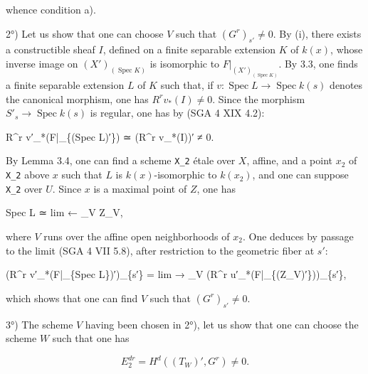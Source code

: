 \documentclass[
  11pt,
  a4paper,
]{book}
\newenvironment{Shaded}{}{}
\newcommand{\NormalTok}[1]{#1}
\begin{document}
whence condition a).

2°) Let us show that one can choose \(V\) such that
\((G^{r})_{s'} \neq 0\). By (i), there exists a constructible sheaf
\(I\), defined on a finite separable extension \(K\) of \(k(x)\), whose
inverse image on \((X')_{(\operatorname{Spec} K)}\) is isomorphic to
\(F|_{(X')_{(\operatorname{Spec} K)}}\). By 3.3, one finds a finite
separable extension \(L\) of \(K\) such that, if
\(v : \operatorname{Spec} L \to \operatorname{Spec} k(s)\) denotes the
canonical morphism, one has \(R^{r}
v_{*}(I) \neq 0\). Since the morphism
\(S'_{s} \to \operatorname{Spec} k(s)\) is regular, one has by (SGA 4
XIX 4.2):

\begin{Shaded}
\begin{Highlighting}[]
\NormalTok{R\^{}r v′\_*(F|\_\{(Spec L)′\}) ≃ (R\^{}r v\_*(I))′ ≠ 0.}
\end{Highlighting}
\end{Shaded}

By Lemma 3.4, one can find a scheme \texttt{X\_2} étale over \(X\),
affine, and a point \(x_{2}\) of \texttt{X\_2} above \(x\) such that
\(L\) is \(k(x)\)-isomorphic to \(k(x_{2})\), and one can suppose
\texttt{X\_2} over \(U\). Since \(x\) is a maximal point of \(Z\), one
has

\begin{Shaded}
\begin{Highlighting}[]
\NormalTok{Spec L ≃ lim ← \_V Z\_V,}
\end{Highlighting}
\end{Shaded}

where \(V\) runs over the affine open neighborhoods of \(x_{2}\). One
deduces by passage to the limit (SGA 4 VII 5.8), after restriction to
the geometric fiber at \(s'\):

\begin{Shaded}
\begin{Highlighting}[]
\NormalTok{(R\^{}r v′\_*(F|\_\{Spec L\})′)\_\{s′\} = lim → \_V (R\^{}r u′\_*(F|\_\{(Z\_V)′\}))\_\{s′\},}
\end{Highlighting}
\end{Shaded}

which shows that one can find \(V\) such that \((G^{r})_{s'} \neq 0\).

3°) The scheme \(V\) having been chosen in 2°), let us show that one can
choose the scheme \(W\) such that one has

\[ E^{dr}_{2} = H^{d}((T_{W})', G^{r}) \neq 0. \]
\end{document}
